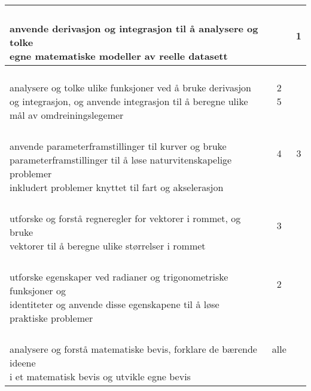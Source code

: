 \documentclass{article}
\begin{document}
\begin{center}
\begin{tabular}{p{10.5cm} | c | c |}
	\shortstack[l]{\\ anvende derivasjon og integrasjon til å analysere og tolke\\ egne matematiske modeller av reelle datasett
	} &\shortstack{\\{}} &\shortstack{1\\{}} \\ \hline
	
	\shortstack[l]{\\ analysere og tolke ulike funksjoner ved å bruke derivasjon\\ og integrasjon, og anvende integrasjon til å beregne ulike\\ mål av omdreiningslegemer
	} &\shortstack{2\\5\\{}} &\shortstack{} \\ \hline		
	
	\shortstack[l]{\\ anvende parameterframstillinger til kurver og bruke\\ parameterframstillinger til å løse naturvitenskapelige problemer\\ inkludert problemer knyttet til fart og akselerasjon
	} &\shortstack{4\\{}\\{}} &\shortstack{3\\{}\\{}} \\ \hline
	
	\shortstack[l]{\\ utforske og forstå regneregler for vektorer i rommet, og bruke\\ vektorer til å beregne ulike størrelser i rommet
	} &\shortstack{3\\{}} &\shortstack{\\{}\\{}} \\ \hline
	
	\shortstack[l]{\\ utforske egenskaper ved radianer og trigonometriske funksjoner og\\ identiteter og anvende disse egenskapene til å løse \\praktiske problemer
	} &\shortstack{2\\{}\\{}} &\shortstack{\\{}\\{}} \\ \hline
	
	\shortstack[l]{\\ analysere og forstå matematiske bevis, forklare de bærende ideene\\ i et matematisk bevis og utvikle egne bevis
	} &\shortstack{alle\\{}\\{}} &\shortstack{\\{}\\{}} \\ \hline
\end{tabular}
\end{center} 
\end{document}
